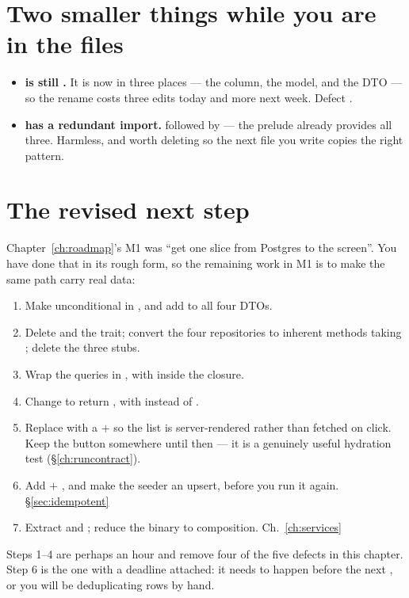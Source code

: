 \section{Two smaller things while you are in the files}

\begin{itemize}
  \item \textbf{ is still .} It is now in three places --- the column, the model,
    and the DTO --- so the rename costs three edits today and more next week. Defect .
  \item \textbf{ has a redundant import.}
     followed by  ---
    the prelude already provides all three. Harmless, and worth deleting so the next file you write
    copies the right pattern.
\end{itemize}

\section{The revised next step}

Chapter~\ref{ch:roadmap}'s M1 was ``get one slice from Postgres to the screen''. You have done that
in its rough form, so the remaining work in M1 is to make the same path carry real data:

\begin{runbook}
\begin{enumerate}
  \item Make  unconditional in , and add
     to all four DTOs. 
  \item Delete  and the trait; convert the four repositories to inherent
    methods taking ; delete the three  stubs. 
  \item Wrap the queries in , with  inside the closure.
  \item Change  to return , with  instead of .
  \item Replace  with a  $+$  so the list is
    server-rendered rather than fetched on click. Keep the button somewhere until then --- it is a
    genuinely useful hydration test (\S\ref{ch:runcontract}).
  \item Add  $+$ , and make the seeder an upsert, before you run it
    again. \S\ref{sec:idempotent}
  \item Extract  and ; reduce the binary to composition.
    Ch.~\ref{ch:services}
\end{enumerate}
\end{runbook}

Steps 1--4 are perhaps an hour and remove four of the five defects in this chapter. Step 6 is the one
with a deadline attached: it needs to happen before the next , or you will be deduplicating rows by hand.

